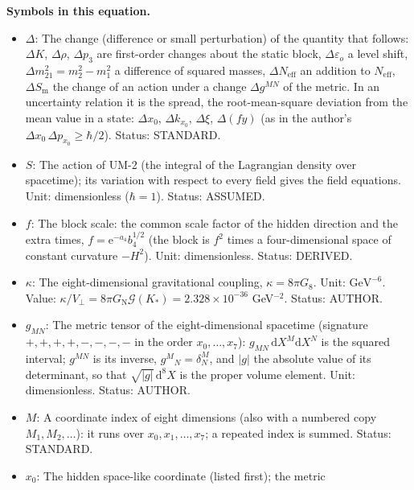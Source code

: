 \documentclass[
  10pt,
]{article}
\providecommand{\tightlist}{%
  \setlength{\itemsep}{0pt}\setlength{\parskip}{0pt}}
\begin{document}
\textbf{Symbols in this equation.}

\begin{itemize}
\tightlist
\item
  \(\Delta\): The change (difference or small perturbation) of the
  quantity that follows: \(\Delta K\), \(\Delta\rho\), \(\Delta p_3\)
  are first-order changes about the static block,
  \(\Delta\varepsilon_o\) a level shift,
  \(\Delta m^2_{21} = m_2^2 - m_1^2\) a difference of squared masses,
  \(\Delta N_{\mathrm{eff}}\) an addition to \(N_{\mathrm{eff}}\),
  \(\Delta S_{\mathrm{m}}\) the change of an action under a change
  \(\Delta g^{MN}\) of the metric. In an uncertainty relation it is the
  spread, the root-mean-square deviation from the mean value in a state:
  \(\Delta x_0\), \(\Delta k_{x_0}\), \(\Delta\xi\), \(\Delta(fy)\) (as
  in the author's \(\Delta x_0\,\Delta p_{x_0} \ge \hbar/2\)). Status:
  STANDARD.
\item
  \(S\): The action of UM-2 (the integral of the Lagrangian density over
  spacetime); its variation with respect to every field gives the field
  equations. Unit: dimensionless (\(\hbar = 1\)). Status: ASSUMED.
\item
  \(f\): The block scale: the common scale factor of the hidden
  direction and the extra times, \(f = \mathrm{e}^{-a_4}b_4^{1/2}\) (the
  block is \(f^2\) times a four-dimensional space of constant curvature
  \(-H^2\)). Unit: dimensionless. Status: DERIVED.
\item
  \(\kappa\): The eight-dimensional gravitational coupling,
  \(\kappa = 8\pi G_8\). Unit: \(\mathrm{GeV}^{-6}\). Value:
  \(\kappa/V_\perp = 8\pi G_{\mathrm{N}}\mathcal{G}(K_*) = 2.328\times10^{-36}\)
  GeV\(^{-2}\). Status: AUTHOR.
\item
  \(g_{MN}\): The metric tensor of the eight-dimensional spacetime
  (signature \(+,+,+,+,-,-,-,-\) in the order \(x_0, \dots, x_7\)):
  \(g_{MN}\,\mathrm{d}X^M\mathrm{d}X^N\) is the squared interval;
  \(g^{MN}\) is its inverse, \(g^M{}_N = \delta^M_N\), and
  \(\lvert g\rvert\) the absolute value of its determinant, so that
  \(\sqrt{\lvert g\rvert}\,\mathrm{d}^8X\) is the proper volume element.
  Unit: dimensionless. Status: AUTHOR.
\item
  \(M\): A coordinate index of eight dimensions (also with a numbered
  copy \(M_1, M_2, \dots\)): it runs over \(x_0, x_1, \dots, x_7\); a
  repeated index is summed. Status: STANDARD.
\item
  \(x_0\): The hidden space-like coordinate (listed first); the metric

\end{itemize}
\end{document}
